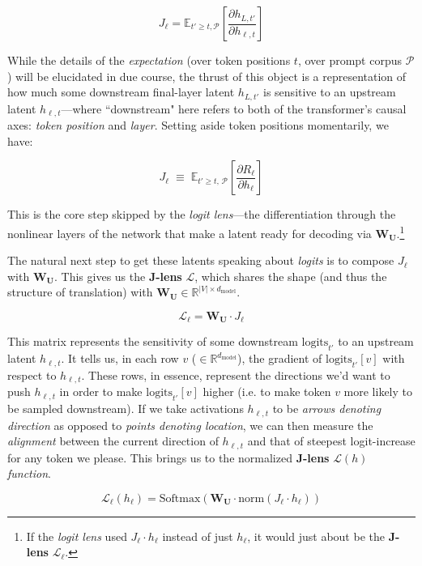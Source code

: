 \documentclass{article}
\newcommand{\logits}{\mathrm{logits}}
\newcommand{\smax}{\mathrm{Softmax}}
\newcommand{\norm}{\mathrm{norm}}
\newcommand{\jlens}{\mathscr{L}}
\newcommand{\dmodel}{d_{\text{model}}}
\begin{document}
\[J_\ell = \mathbb{E}_{t' \ge t, \mathscr{P}}\left[\frac{\partial h_{L,t'}}{\partial h_{\ell,t}}\right]\]

While the details of the \textit{expectation} (over token positions \(t\), over prompt corpus \(\mathscr{P}\)) will be elucidated in due course, the thrust of this object is a representation of how much some downstream final-layer latent \(h_{L,t'}\) is sensitive to an upstream latent \(h_{\ell, t}\)---where ``downstream" here refers to both of the transformer's causal axes: \textit{token position} and \textit{layer}. Setting aside token positions momentarily, we have:


\[J_\ell \;\equiv\; \mathbb{E}_{t' \ge t,\, \mathscr{P}}\!\left[\frac{\partial R_\ell}{\partial h_\ell}\right]\]

This is the core step skipped by the \textit{logit lens}---the differentiation through the nonlinear layers of the network that make a latent ready for decoding via \(\mathbf{W_U}\).\footnote{If the \textit{logit lens} used \(J_\ell \cdot h_{\ell}\) instead of just \(h_{\ell}\), it would just about be the \textbf{J-lens} \(\jlens_\ell\).} 

The natural next step to get these latents speaking about \textit{logits} is to compose \(J_\ell\) with \(\mathbf{W_U}\). This gives us the \textbf{J-lens} \(\jlens\), which shares the shape (and thus the structure of translation) with \(\mathbf{W_U} \in\mathbb{R}^{|V| \times \dmodel}\).

\[\jlens_\ell = \mathbf{W_U} \cdot J_\ell\]

This matrix represents the sensitivity of some downstream \(\logits_{t'}\) to an upstream latent \(h_{\ell, t}\). It tells us, in each row \(v\) (\(\in \mathbb{R}^{\dmodel}\)), the gradient of \(\logits_{t'}[v]\) with respect to \(h_{\ell,t}\). These rows, in essence, represent the directions we'd want to push \(h_{\ell,t}\) in order to make \(\logits_{t'}[v]\) higher (i.e. to make token \(v\) more likely to be sampled downstream). If we take activations \(h_{\ell,t}\) to be \textit{arrows denoting direction} as opposed to \textit{points denoting location}, we can then measure the \textit{alignment} between the current direction of \(h_{\ell,t}\) and that of steepest logit-increase for any token we please. This brings us to the normalized \textbf{J-lens} \(\jlens(h)\) \textit{function}.

\[\jlens_\ell(h_\ell) = \smax(\mathbf{W_U} \cdot \norm(J_\ell \cdot h_\ell))\]
\end{document}
